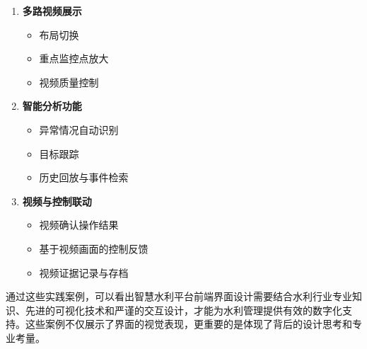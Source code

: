 \begin{enumerate}
\def\labelenumi{\arabic{enumi}.}
\tightlist
\item
  \textbf{多路视频展示}

  \begin{itemize}
  \tightlist
  \item
    布局切换
  \item
    重点监控点放大
  \item
    视频质量控制
  \end{itemize}
\item
  \textbf{智能分析功能}

  \begin{itemize}
  \tightlist
  \item
    异常情况自动识别
  \item
    目标跟踪
  \item
    历史回放与事件检索
  \end{itemize}
\item
  \textbf{视频与控制联动}

  \begin{itemize}
  \tightlist
  \item
    视频确认操作结果
  \item
    基于视频画面的控制反馈
  \item
    视频证据记录与存档
  \end{itemize}
\end{enumerate}

通过这些实践案例，可以看出智慧水利平台前端界面设计需要结合水利行业专业知识、先进的可视化技术和严谨的交互设计，才能为水利管理提供有效的数字化支持。这些案例不仅展示了界面的视觉表现，更重要的是体现了背后的设计思考和专业考量。
